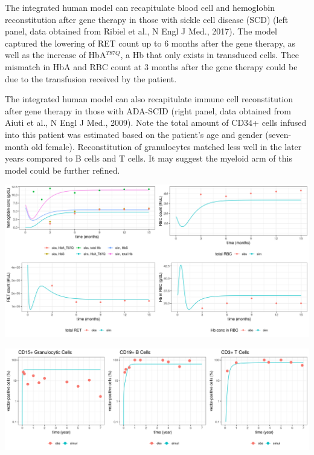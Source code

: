 \documentclass[a0paper,portrait]{baposter}
\begin{document}
\begin{poster}
{The integrated human model can recapitulate blood cell and hemoglobin reconstitution after gene therapy in those with sickle cell disease (SCD) (left panel, data obtained from Ribiel et al., N Engl J Med., 2017). 
The model captured the lowering of RET count up to 6 months after the gene therapy, as well as the increase of HbA$^{T87Q}$, a Hb that only exists in transduced cells.
Thee mismatch in HbA and RBC count at 3 months after the gene therapy could be due to the transfusion received by the patient.

The integrated human model can also recapitulate immune cell reconstitution after gene therapy in those with ADA-SCID (right panel, data obtained from Aiuti et al., N Engl J Med., 2009). 
Note the total amount of CD34+ cells infused into this patient was estimated based on the patient's age and gender (seven-month old female). 
Reconstitution of granulocytes matched less well in the later years compared to B cells and T cells. 
It may suggest the myeloid arm of this model could be further refined.

\begin{minipage}[b]{0.47\linewidth}
\centering
\includegraphics[width=\textwidth]{../img/human_erythroid_validation.png}
\end{minipage}
\hspace{0.5cm}
\begin{minipage}[b]{0.47\linewidth}
\centering
\includegraphics[width=\textwidth]{../img/human_ada_scid_GT.png}
\end{minipage}


}
\end{poster}
\end{document}
